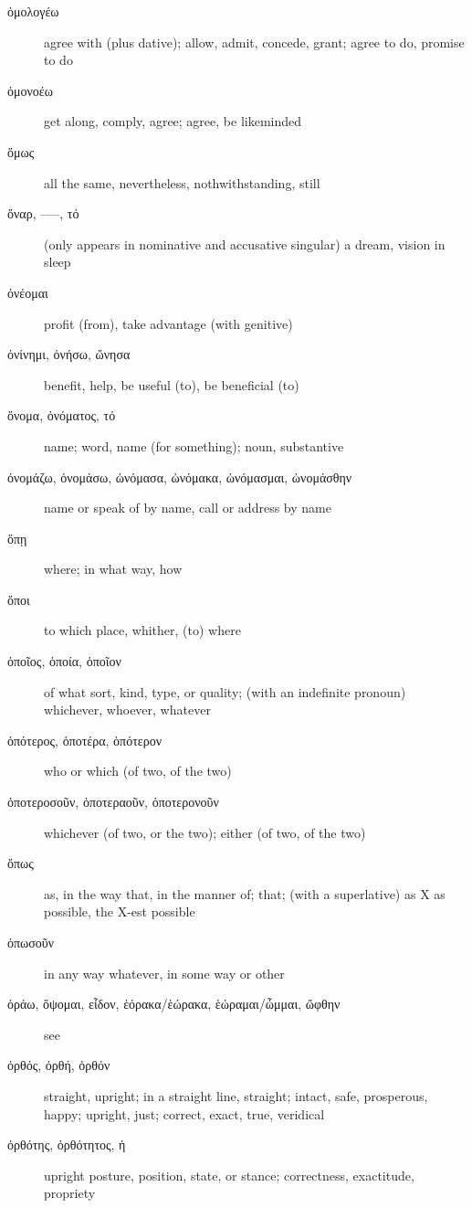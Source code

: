 \documentclass[12pt,letterpaper]{article}
\begin{document}
\begin{description}
    \item[\textgreek{ὁμολογέω}] agree with (plus dative); allow, admit, concede, grant; agree to do, promise to do
    \item[\textgreek{ὁμονοέω}] get along, comply, agree; agree, be likeminded
    \item[\textgreek{ὅμως}] \marginnote{*}all the same, nevertheless, nothwithstanding, still
    \item[\textgreek{ὄναρ, –––, τό}] (only appears in nominative and accusative singular) a dream, vision in sleep
    \item[\textgreek{ὀνέομαι}] profit (from), take advantage (with genitive)
    \item[\textgreek{ὀνίνημι, ὀνήσω, ὤνησα}] benefit, help, be useful (to), be beneficial (to)
    \item[\textgreek{ὄνομα, ὀνόματος, τό}] \marginnote{*}name; word, name (for something); noun, substantive
    \item[\textgreek{ὀνομάζω, ὀνομάσω, ὠνόμασα, ὠνόμακα, ὠνόμασμαι, ὠνομάσθην}] \marginnote{*}name or speak of by name, call or address by name
    \item[\textgreek{ὅπῃ}] where; in what way, how
    \item[\textgreek{ὅποι}] to which place, whither, (to) where
    \item[\textgreek{ὁποῖος, ὁποία, ὁποῖον}] of what sort, kind, type, or quality; (with an indefinite pronoun) whichever, whoever, whatever
    \item[\textgreek{ὁπότερος, ὁποτέρα, ὁπότερον}] who or which (of two, of the two)
    \item[\textgreek{ὁποτεροσοῦν, ὁποτεραοῦν, ὁποτερονοῦν}] whichever (of two, or the two); either (of two, of the two)
    \item[\textgreek{ὅπως}] \marginnote{*}as, in the way that, in the manner of; that; (with a superlative) as X as possible, the X-est possible
    \item[\textgreek{ὁπωσοῦν}] in any way whatever, in some way or other
    \item[\textgreek{ὁράω, ὄψομαι, εἶδον, ἑόρακα/ἑώρακα, ἑώραμαι/ὦμμαι, ὤφθην}] \marginnote{*}see
    \item[\textgreek{ὀρθός, ὀρθή, ὀρθόν}] \marginnote{*}straight, upright; in a straight line, straight; intact, safe, prosperous, happy; upright, just; correct, exact, true, veridical
    \item[\textgreek{ὀρθότης, ὀρθότητος, ἡ}] upright posture, position, state, or stance; correctness, exactitude, propriety

\end{description}
\end{document}
